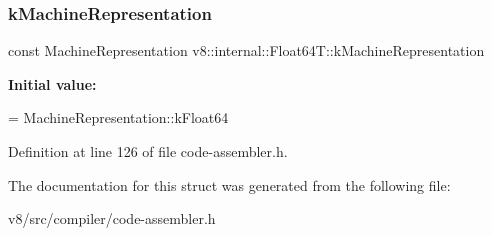 \subsubsection{\texorpdfstring{k\+Machine\+Representation}{kMachineRepresentation}}
{\footnotesize\ttfamily const Machine\+Representation v8\+::internal\+::\+Float64\+T\+::k\+Machine\+Representation\hspace{0.3cm}{\ttfamily [static]}}

{\bfseries Initial value\+:}
\begin{DoxyCode}
=
      MachineRepresentation::kFloat64
\end{DoxyCode}


Definition at line 126 of file code-\/assembler.\+h.



The documentation for this struct was generated from the following file\+:\begin{DoxyCompactItemize}
\item 
v8/src/compiler/code-\/assembler.\+h\end{DoxyCompactItemize}
